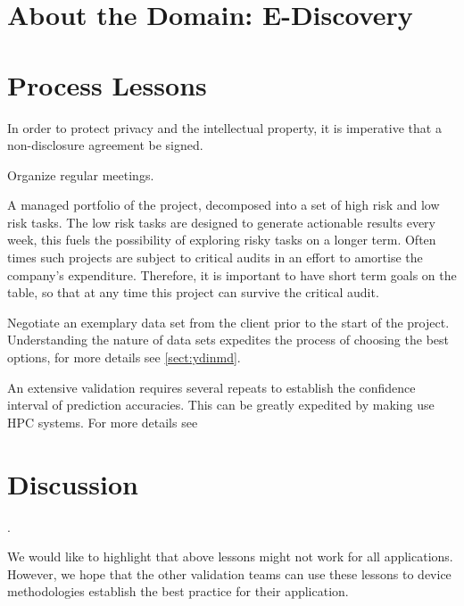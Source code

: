 \documentclass{sig-alternate-05-2015}
\newcommand{\bi}{\begin{itemize*}}
\newcommand{\ei}{\end{itemize*}}
\newcommand{\tion}[1]{\textsection\ref{sect:#1}}
\begin{document}
\section{About the Domain: E-Discovery}
 
\section{Process Lessons}

\bi
\item In order to protect privacy and the intellectual property, it is imperative that a non-disclosure agreement be signed.
\item Organize regular meetings.
\item A managed portfolio of the project, decomposed into a set of high risk and low risk tasks. The low risk tasks are designed to generate actionable results every week, this fuels the possibility of exploring risky tasks on a longer term. Often times such projects are subject to critical audits in an effort to amortise the company's expenditure. Therefore, it is important to have short term goals on the table, so that at any time this project can survive the critical audit. 
\item Negotiate an exemplary data set from the client prior to the start of the project. Understanding the nature of data sets expedites the process of choosing the best options, for more details see \tion{ydinmd}.
\item An extensive validation requires several repeats to establish the confidence interval of prediction accuracies. This can be greatly expedited by making use HPC systems. For more details see
\ei
\section{Discussion}.

We would like to highlight that above lessons might not work for all applications. However, we hope that the other validation teams can use these lessons to device methodologies establish the best practice for their application. 

\end{document}
